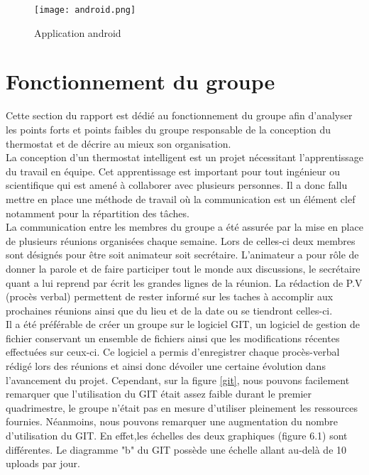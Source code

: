\documentclass[12pt]{report}
\begin{document}
\begin{figure}
\centering
\texttt{[image: android.png]}
\caption{\label{android} Application android}
\end{figure}

\noindent

\chapter{Fonctionnement du groupe}
Cette section du rapport est d\'{e}di\'{e} au fonctionnement du groupe afin d’analyser les points forts et points faibles du groupe responsable de la conception du thermostat et de d\'{e}crire au mieux son organisation.\\

\noindent
La conception d’un thermostat intelligent est un projet n\'{e}cessitant l’apprentissage du travail en \'{e}quipe. Cet apprentissage est important pour tout ing\'{e}nieur ou scientifique qui est amen\'{e} \`{a} collaborer avec plusieurs personnes. Il a donc fallu mettre en place une m\'{e}thode de travail o\`{u} la communication est un \'{e}l\'{e}ment clef notamment pour la r\'{e}partition des t\^{a}ches.\\

\noindent
La communication entre les membres du groupe a \'{e}t\'{e} assur\'{e}e par la mise en place de plusieurs r\'{e}unions organis\'{e}es chaque semaine. Lors de celles-ci deux membres sont désignés pour être soit animateur soit secrétaire. L'animateur a pour r\^ole de donner
la parole et de faire participer tout le monde aux discussions, le secrétaire quant a lui
reprend par écrit les grandes lignes de la réunion. La rédaction de P.V (procès verbal) permettent de rester informé sur les taches à accomplir aux
prochaines réunions ainsi que du lieu et de la date ou se tiendront celles-ci.\\

\noindent
Il a \'{e}t\'{e} pr\'{e}f\'{e}rable de cr\'{e}er un groupe sur le logiciel GIT, un logiciel de gestion de fichier conservant un ensemble de fichiers ainsi que les modifications r\'{e}centes effectu\'{e}es sur ceux-ci. Ce logiciel a permis d’enregistrer chaque proc\`{e}s-verbal r\'{e}dig\'{e} lors des r\'{e}unions et ainsi donc dévoiler une certaine évolution dans l'avancement du projet. Cependant, sur la figure \ref{git}, nous pouvons facilement remarquer que l'utilisation du GIT était assez faible durant le premier quadrimestre, le groupe n'était pas en mesure d'utiliser pleinement les ressources fournies. Néanmoins, nous pouvons remarquer une  augmentation du nombre d'utilisation du GIT. En effet,les échelles des deux graphiques (figure 6.1) sont différentes. Le diagramme "b" du GIT possède une échelle allant au-delà de 10 uploads par jour.\\
\end{document}
